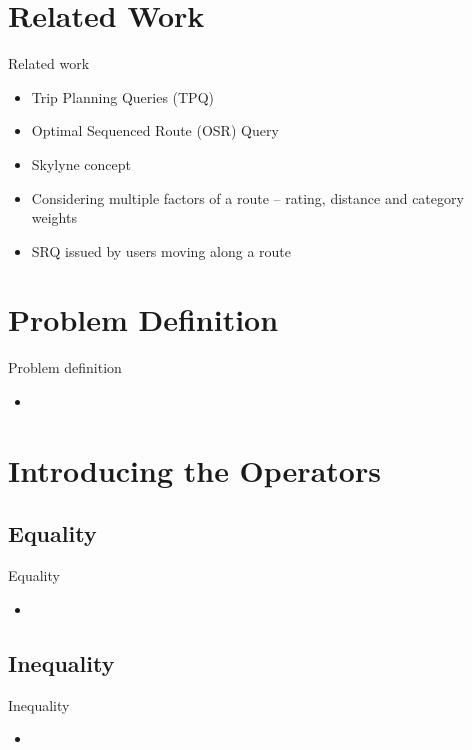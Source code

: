 \documentclass[18pt]{beamer}
\begin{document}
\section{Related Work}
	\begin{frame}{Related work}
	
		\begin{itemize}
			\item Trip Planning Queries (TPQ)
			\item Optimal Sequenced Route (OSR) Query
			\item Skylyne concept 
			\item Considering multiple factors of a route – rating, distance and category weights
			\item SRQ issued by users moving along a route
			\newline
		\end{itemize}
	
	\end{frame}

\section{Problem Definition}
	\begin{frame}{Problem definition}
	
		\begin{itemize}
			\item
		\end{itemize}
	
	\end{frame}

\section{Introducing the Operators}

	\subsection{Equality}
		\begin{frame}{Equality}
			
			\begin{itemize}
				\item
			\end{itemize}
			
		\end{frame}
					
	\subsection{Inequality}
		\begin{frame}{Inequality}
		
			\begin{itemize}
				\item
			\end{itemize}
		
		\end{frame}
	
\end{document}
